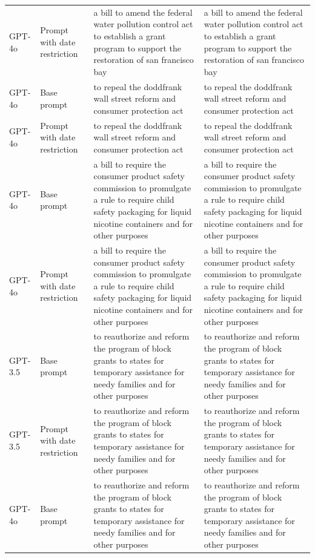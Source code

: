 \begin{longtable}{>{\raggedright\arraybackslash}p{1.4cm}>{\raggedright\arraybackslash}p{1.4cm}>{\raggedright\arraybackslash}p{5.5cm}>{\raggedright\arraybackslash}p{5.5cm}}
GPT-4o & Prompt with date restriction & a bill to amend the federal water pollution control act to establish a grant program to support the restoration of san francisco bay & a bill to amend the federal water pollution control act to establish a grant program to support the restoration of san francisco bay\\
GPT-4o & Base prompt & to repeal the doddfrank wall street reform and consumer protection act & to repeal the doddfrank wall street reform and consumer protection act\\
GPT-4o & Prompt with date restriction & to repeal the doddfrank wall street reform and consumer protection act & to repeal the doddfrank wall street reform and consumer protection act\\
GPT-4o & Base prompt & a bill to require the consumer product safety commission to promulgate a rule to require child safety packaging for liquid nicotine containers and for other purposes & a bill to require the consumer product safety commission to promulgate a rule to require child safety packaging for liquid nicotine containers and for other purposes\\
GPT-4o & Prompt with date restriction & a bill to require the consumer product safety commission to promulgate a rule to require child safety packaging for liquid nicotine containers and for other purposes & a bill to require the consumer product safety commission to promulgate a rule to require child safety packaging for liquid nicotine containers and for other purposes\\
GPT-3.5 & Base prompt & to reauthorize and reform the program of block grants to states for temporary assistance for needy families and for other purposes & to reauthorize and reform the program of block grants to states for temporary assistance for needy families and for other purposes\\
GPT-3.5 & Prompt with date restriction & to reauthorize and reform the program of block grants to states for temporary assistance for needy families and for other purposes & to reauthorize and reform the program of block grants to states for temporary assistance for needy families and for other purposes\\
GPT-4o & Base prompt & to reauthorize and reform the program of block grants to states for temporary assistance for needy families and for other purposes & to reauthorize and reform the program of block grants to states for temporary assistance for needy families and for other purposes\\

\end{longtable}
